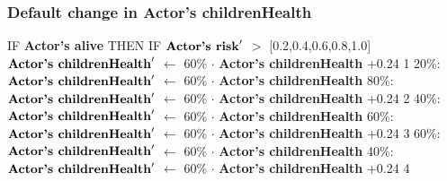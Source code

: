 \documentclass{article}%
\begin{document}
\subsubsection{Default change in Actor's childrenHealth}%
\label{ssubsec:Default change in Actor's childrenHealth}%
\begin{flushleft}%
IF %
\textbf{Actor's alive}%
\linebreak%
\hspace*{2em}%
THEN %
IF %
$\mbox{\textbf{Actor's risk}} '$%
$>$%
{[}0.2,0.4,0.6,0.8,1.0{]}%
\linebreak%
\hspace*{4em}%
$\mbox{\textbf{Actor's childrenHealth}} '$%
$\leftarrow$%
60\%%
$\cdot$%
\textbf{Actor's childrenHealth}%
+0.24%
\linebreak%
\hspace*{4em}%
1 %
\linebreak%
\hspace*{6em}%
20\%: %
$\mbox{\textbf{Actor's childrenHealth}} '$%
$\leftarrow$%
60\%%
$\cdot$%
\textbf{Actor's childrenHealth}%
\linebreak%
\hspace*{6em}%
80\%: %
$\mbox{\textbf{Actor's childrenHealth}} '$%
$\leftarrow$%
60\%%
$\cdot$%
\textbf{Actor's childrenHealth}%
+0.24%
\linebreak%
\hspace*{4em}%
2 %
\linebreak%
\hspace*{6em}%
40\%: %
$\mbox{\textbf{Actor's childrenHealth}} '$%
$\leftarrow$%
60\%%
$\cdot$%
\textbf{Actor's childrenHealth}%
\linebreak%
\hspace*{6em}%
60\%: %
$\mbox{\textbf{Actor's childrenHealth}} '$%
$\leftarrow$%
60\%%
$\cdot$%
\textbf{Actor's childrenHealth}%
+0.24%
\linebreak%
\hspace*{4em}%
3 %
\linebreak%
\hspace*{6em}%
60\%: %
$\mbox{\textbf{Actor's childrenHealth}} '$%
$\leftarrow$%
60\%%
$\cdot$%
\textbf{Actor's childrenHealth}%
\linebreak%
\hspace*{6em}%
40\%: %
$\mbox{\textbf{Actor's childrenHealth}} '$%
$\leftarrow$%
60\%%
$\cdot$%
\textbf{Actor's childrenHealth}%
+0.24%
\linebreak%
\hspace*{4em}%
4 %
\linebreak%

\end{flushleft}
\end{document}
